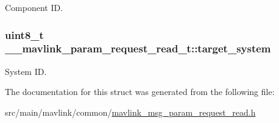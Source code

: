 Component I\+D. 

\hypertarget{struct____mavlink__param__request__read__t_adc4407f944beba256a385768ea61e588}{
\subsubsection[{target\+\_\+system}]{\setlength{\rightskip}{0pt plus 5cm}uint8\+\_\+t \+\_\+\+\_\+mavlink\+\_\+param\+\_\+request\+\_\+read\+\_\+t\+::target\+\_\+system}}\label{struct____mavlink__param__request__read__t_adc4407f944beba256a385768ea61e588}


System I\+D. 



The documentation for this struct was generated from the following file\+:\begin{DoxyCompactItemize}
\item 
src/main/mavlink/common/\hyperlink{mavlink__msg__param__request__read_8h}{mavlink\+\_\+msg\+\_\+param\+\_\+request\+\_\+read.\+h}\end{DoxyCompactItemize}
